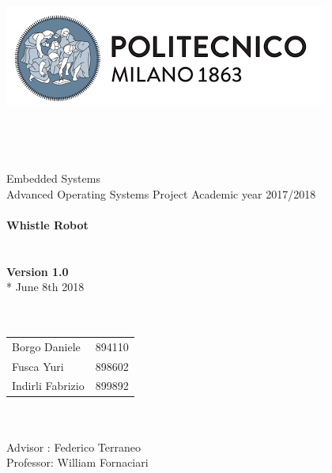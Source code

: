 \begin{titlepage}
	\begin{center}
		\includegraphics[scale=0.5]{files/images/PolimiLogo}
		\ \\ \ \\ \ \\ \ \\ \ \\
		\huge Embedded Systems \\
		\huge Advanced Operating Systems Project
		Academic year 2017/2018
		\ \\ \ \\
		\textbf{Whistle Robot}
		\ \\ \ \\ \ \\
		\textbf{Version 1.0}\\*
		June 8th 2018
		\ \\ \ \\ \ \\
		\begin{tabular}{ l c }
			Borgo Daniele & 894110\\
			Fusca Yuri & 898602 \\
			Indirli Fabrizio & 899892 \\
		\end{tabular}
		\ \\ \ \\
		Advisor : Federico Terraneo \\
		Professor: William Fornaciari
	\end{center}
\end{titlepage}